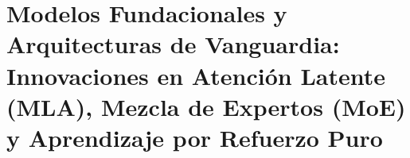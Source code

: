 
\providecommand{\mathbb}[1]{\mathbf{#1}}
\providecommand{\text}[1]{\mbox{#1}}
\providecommand{\binom}[2]{{{#1 \choose #2}}}

\section[Modelos Fundacionales y Arquitecturas de Vanguardia]{Modelos Fundacionales y Arquitecturas de Vanguardia: Innovaciones en Atención Latente (MLA), Mezcla de Expertos (MoE) y Aprendizaje por Refuerzo Puro}


